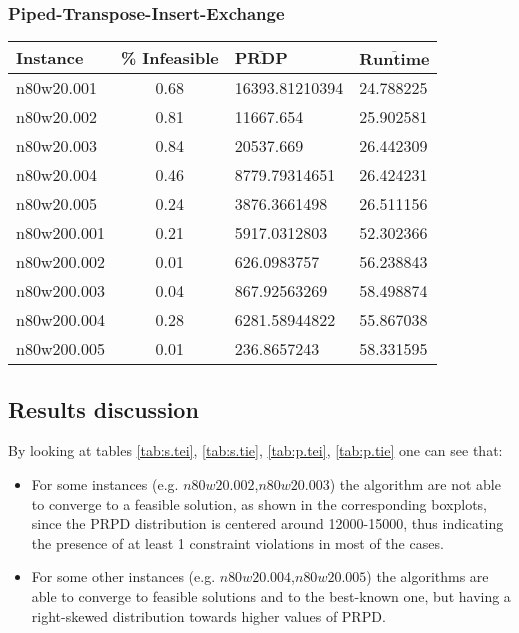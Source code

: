 \begin{homeworkProblem}
\subsubsection{Piped-Transpose-Insert-Exchange}
\begin{center}
\begin{tabular}{|l|c|l|l|}
\hline
\textbf{Instance}& \textbf{\% Infeasible} & $\mathbf{\bar{PRDP}}$ &$\mathbf{\bar{Runtime}}$\\
\hline
n80w20.001&0.68&16393.81210394&24.788225\\
\hline
n80w20.002&0.81&11667.654&25.902581\\
\hline
n80w20.003&0.84&20537.669&26.442309\\
\hline
n80w20.004&0.46&8779.79314651&26.424231\\
\hline
n80w20.005&0.24&3876.3661498&26.511156\\
\hline
n80w200.001&0.21&5917.0312803&52.302366\\
\hline
n80w200.002&0.01&626.0983757&56.238843\\
\hline
n80w200.003&0.04&867.92563269&58.498874\\
\hline
n80w200.004&0.28&6281.58944822&55.867038\\
\hline
n80w200.005&0.01&236.8657243&58.331595\\
\hline
\end{tabular}
\label{tab:p.tie}
\end{center}

\subsection{Results discussion}
By looking at tables \ref{tab:s.tei}, \ref{tab:s.tie}, \ref{tab:p.tei}, \ref{tab:p.tie} one can see that:
\begin{itemize}

\item For some instances (e.g. $n80w20.002$,$n80w20.003$) the algorithm are not able to converge to a feasible solution, as shown in the corresponding boxplots, since the PRPD distribution is centered around 12000-15000, thus indicating the presence of at least 1 constraint violations in most of the cases.

\item For some other instances (e.g. $n80w20.004$,$n80w20.005$) the algorithms are able to converge to feasible solutions and to the best-known one, but having a right-skewed distribution towards higher values of PRPD.


\end{itemize}
\end{homeworkProblem}
